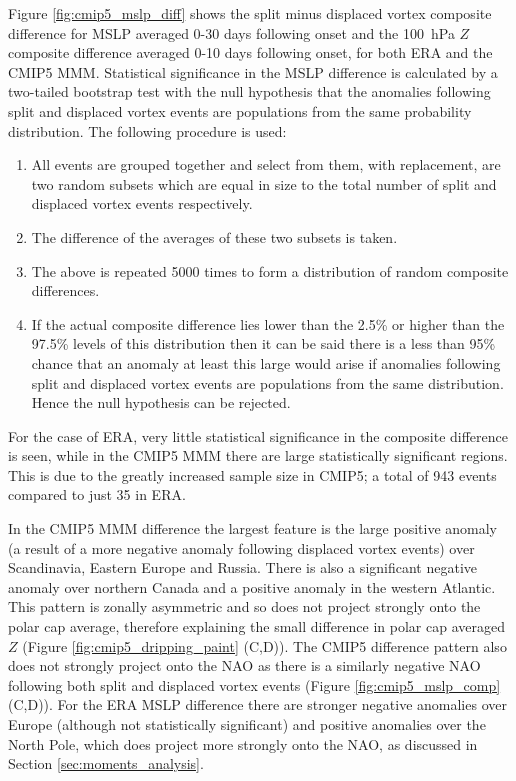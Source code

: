 \bigskip Figure \ref{fig:cmip5_mslp_diff} shows the split minus displaced vortex
composite difference for MSLP averaged 0-30 days following onset and the 100~hPa
$Z$ composite difference averaged 0-10 days following onset, for both ERA and
the CMIP5 MMM. Statistical significance in the MSLP difference is calculated by
a two-tailed bootstrap test with the null hypothesis that the anomalies
following split and displaced vortex events are populations from the same
probability distribution. The following procedure is used:
\begin{enumerate}
\item All events are grouped together and select from them, with replacement,
  are two random subsets which are equal in size to the total number of split
  and displaced vortex events respectively.
\item The difference of the averages of these two subsets is taken.
\item The above is repeated 5000 times to form a distribution of random
  composite differences.
\item If the actual composite difference lies lower than the 2.5\% or higher
  than the 97.5\% levels of this distribution then it can be said there is a
  less than 95\% chance that an anomaly at least this large would arise if
  anomalies following split and displaced vortex events are populations from the
  same distribution. Hence the null hypothesis can be rejected.
\end{enumerate}
For the case of ERA, very little statistical significance in the
composite difference is seen, while in the CMIP5 MMM there are large
statistically significant regions. This is due to the greatly increased sample
size in CMIP5; a total of 943 events compared to just 35 in ERA. 

In the CMIP5 MMM difference the largest feature is the large positive anomaly (a
result of a more negative anomaly following displaced vortex events) over
Scandinavia, Eastern Europe and Russia. There is also a significant negative
anomaly over northern Canada and a positive anomaly in the western
Atlantic. This pattern is zonally asymmetric and so does not project strongly
onto the polar cap average, therefore explaining the small difference in polar
cap averaged $Z$ (Figure \ref{fig:cmip5_dripping_paint} (C,D)). The CMIP5
difference pattern also does not strongly project onto the NAO as there is a
similarly negative NAO following both split and displaced vortex events (Figure
\ref{fig:cmip5_mslp_comp} (C,D)). For the ERA MSLP difference there are stronger
negative anomalies over Europe (although not statistically significant) and
positive anomalies over the North Pole, which does project more strongly onto
the NAO, as discussed in Section \ref{sec:moments_analysis}. 

